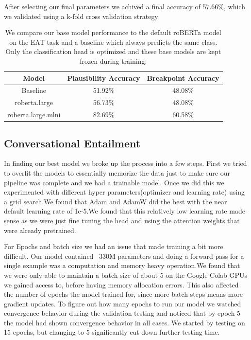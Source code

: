\documentclass[11pt,a4paper]{article}
\begin{document}
After selecting our final parameters we achived a final accuracy of 57.66\%, which we validated using a k-fold cross validation strategy

\begin{table}
\centering
\begin{tabular}{ccc}
\hline \textbf{Model} & \textbf{Plausibility Accuracy} & \textbf{Breakpoint Accuracy} \\ \hline
Baseline & 51.92\% & 48.08\% \\
roberta.large & 56.73\% & 48.08\% \\
roberta.large.mlni & 82.69\% & 60.58\% \\
\hline
\end{tabular}
\caption{\label{font-table} We compare our base model performance to the default roBERTa model on the EAT task and a baseline which always predicts the same class. Only the classification head is optimized and these base models are kept frozen during training.}
\end{table}

\subsection{Conversational Entailment}

In finding our best model we broke up the process into a few steps. First we tried to overfit the models to essentially memorize the data just to make sure our pipeline was complete and we had a trainable model. Once we did this we experimented with different hyper parameters(optimizer and learning rate) using a grid search.We found that Adam and AdamW did the best with the near default learning rate of 1e-5.We found that this relatively low learning rate made sense as we were just fine tuning the head and using the attention weights that were already pretrained. 

For Epochs and batch size we had an issue that made training a bit more difficult. Our model contained ~330M parameters and doing a forward pass for a single example was a computation and memory heavy operation.We found that we were only able to maintain a batch size of about 5 on the Google Colab GPUs we gained access to, before having memory allocation errors. This also affected the number of epochs the model trained for, since more batch steps means more gradient updates. To figure out how many epochs to run our model we watched convergence behavior during the validation testing and noticed that by epoch 5 the model had shown convergence behavior in all cases. We started by testing on 15 epochs, but changing to 5 significantly cut down further testing time. 
\end{document}
